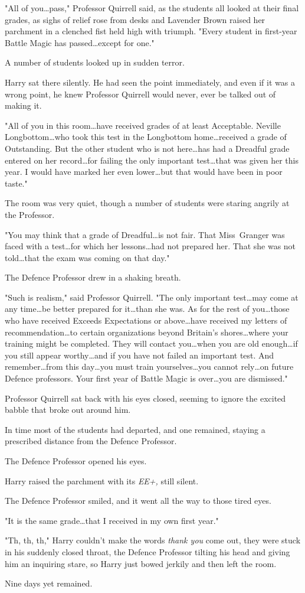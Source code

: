 "All of you…pass," Professor Quirrell said, as the students all looked
at their final grades, as sighs of relief rose from desks and Lavender Brown
raised her parchment in a clenched fist held high with triumph. "Every student
in first-year Battle Magic has passed…except for one."

A number of students looked up in sudden terror.

Harry sat there silently. He had seen the point immediately, and even if it was
a wrong point, he knew Professor Quirrell would never, ever be talked out of
making it.

"All of you in this room…have received grades of at least Acceptable.
Neville Longbottom…who took this test in the Longbottom home…received
a grade of Outstanding. But the other student who is not here…has
had a Dreadful grade entered on her record…for failing the only
important test…that was given her this year. I would have marked her
even lower…but that would have been in poor taste."

The room was very quiet, though a number of students were staring angrily at
the Professor.

"You may think that a grade of Dreadful…is not fair. That Miss~Granger
was faced with a test…for which her lessons…had not prepared
her. That she was not told…that the exam was coming on that day."

The Defence Professor drew in a shaking breath.

"Such is realism," said Professor Quirrell. "The only important test…may
come at any time…be better prepared for it…than she was. As
for the rest of you…those who have received Exceeds Expectations or
above…have received my letters of recommendation…to certain
organizations beyond Britain's shores…where your training might be
completed. They will contact you…when you are old enough…if you
still appear worthy…and if you have not failed an important test. And
remember…from this day…you must train yourselves…you
cannot rely…on future Defence professors. Your first year of Battle
Magic is over…you are dismissed."

Professor Quirrell sat back with his eyes closed, seeming to ignore the excited
babble that broke out around him.

In time most of the students had departed, and one remained, staying a
prescribed distance from the Defence Professor.

The Defence Professor opened his eyes.

Harry raised the parchment with its \emph{EE+,} still silent.

The Defence Professor smiled, and it went all the way to those tired eyes.

"It is the same grade…that I received in my own first year."

"Th, th, th," Harry couldn't make the words \emph{thank you} come out, they
were stuck in his suddenly closed throat, the Defence Professor tilting his
head and giving him an inquiring stare, so Harry just bowed jerkily and then
left the room.

Nine days yet remained.
